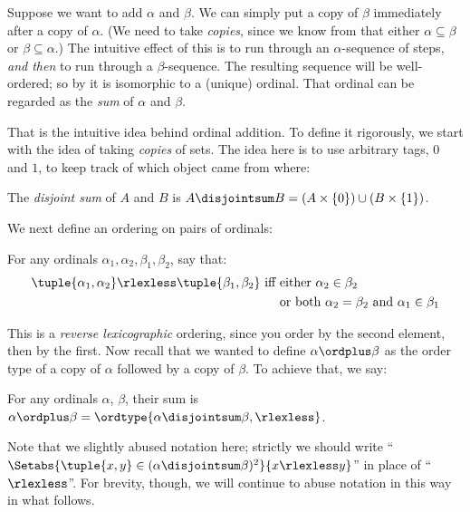 \documentclass[../../../include/open-logic-section]{subfiles}
\begin{document}

Suppose we want to add $\alpha$ and $\beta$. We can simply put a
{copy} of $\beta$ immediately after a copy of $\alpha$. (We need to
take \emph{copies}, since we know from
 that either $\alpha
\subseteq \beta$ or $\beta \subseteq \alpha$.) The intuitive effect of
this is to run through an $\alpha$-sequence of steps, \emph{and then}
to run through a $\beta$-sequence. The resulting sequence will be
well-ordered; so by
 it is isomorphic
to a (unique) ordinal. That ordinal can be regarded as the \emph{sum}
of $\alpha$ and $\beta$. 

That is the intuitive idea behind ordinal addition. To define it
rigorously, we start with the idea of taking \emph{copies} of sets.
The idea here is to use arbitrary tags, $0$ and $1$, to keep track of
which object came from where:

\begin{defn}
The \emph{disjoint sum} of $A$ and $B$ is $A \disjointsum B = (A\times
\{0\}) \cup (B \times \{1\})$.
\end{defn}

We next define an ordering on pairs of ordinals:

\begin{defn}
For any ordinals $\alpha_1, \alpha_2, \beta_1, \beta_2$, say that:
\begin{align*}
	\tuple{\alpha_1, \alpha_2} \rlexless \tuple{\beta_1, \beta_2}\text{ iff }& 
	\text{either $\alpha_2 \in \beta_2$}\\
	& \text{or both $\alpha_2 = \beta_2$ and $\alpha_1 \in \beta_1$}
\end{align*} 
\end{defn}

This is a \emph{reverse lexicographic} ordering, since you order by
the second element, then by the first. Now recall that we wanted to
define $\alpha \ordplus \beta$ as the order type of a copy of $\alpha$
followed by a copy of $\beta$. To achieve that, we say:

\begin{defn}
For any ordinals $\alpha$, $\beta$, their sum is $\alpha \ordplus
\beta = \ordtype{\alpha \disjointsum \beta, \rlexless}$.
\end{defn}
\noindent
Note that we slightly abused notation here; strictly we should write ``$\Setabs{\tuple{x,y}\in (\alpha\disjointsum\beta)^2}{x \rlexless y}$'' in place of ``$\rlexless$''. For brevity, though, we will continue to abuse notation in this way in what follows. 
\end{document}
